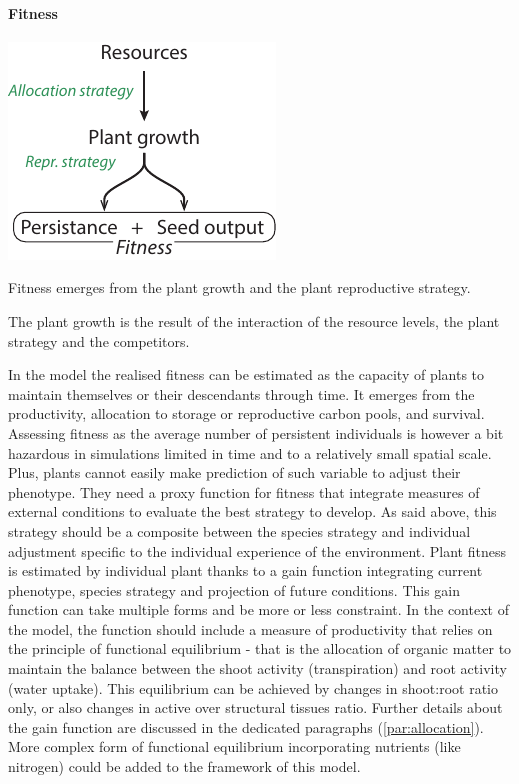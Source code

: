 \paragraph{Fitness}
\begin{marginfigure}
\includegraphics{./Figures/fitness.pdf}
\caption{Fitness emerges from the plant growth and the plant reproductive strategy.}
\begin{footnotesize}
The plant growth is the result of the interaction of the resource levels, the plant strategy and the competitors.
\end{footnotesize}
\end{marginfigure}
In the model the realised fitness can be estimated as the capacity of plants to maintain themselves or their descendants through time. It emerges from the productivity, allocation to storage or reproductive carbon pools, and survival. Assessing fitness as the average number of persistent individuals is however a bit hazardous in simulations limited in time and to a relatively small spatial scale. Plus, plants cannot easily make prediction of such variable to adjust their phenotype. They need a proxy function for fitness that integrate measures of external conditions to evaluate the best strategy to develop. As said above, this strategy should be a composite between the species strategy and individual adjustment specific to the individual experience of the environment. Plant fitness is estimated by individual plant thanks to a gain function integrating current phenotype, species strategy and projection of future conditions. This gain function can take multiple forms and be more or less constraint. In the context of the model, the function should include a measure of productivity that relies on the principle of functional equilibrium - that is the allocation of organic matter to maintain the balance between the shoot activity (transpiration) and root activity (water uptake). This equilibrium can be achieved by changes in shoot:root ratio only, or also changes in active over structural tissues ratio. Further details about the gain function are discussed in the dedicated paragraphs (\ref{par:allocation}). More complex form of functional equilibrium incorporating nutrients (like nitrogen) could be added to the framework of this model.


